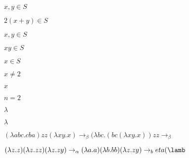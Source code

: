 \documentclass[10pt]{book}
\begin{document}
\begin{mdSnippets}
\begin{mdInlineSnippet}[4dd681d6895e10a343fda2e1bc698728]%
$x,y\in S$\end{mdInlineSnippet}%
\begin{mdInlineSnippet}[7f29155bf30f535900d25bd1a7d19cf5]%
$2(x+y)\in S$\end{mdInlineSnippet}%
\begin{mdInlineSnippet}[4dd681d6895e10a343fda2e1bc698728]%
$x,y\in S$\end{mdInlineSnippet}%
\begin{mdInlineSnippet}[94ab0a60ff9cfe6ad27f8238d7e0f075]%
$xy \in S$\end{mdInlineSnippet}%
\begin{mdInlineSnippet}%
$x\in S$\end{mdInlineSnippet}%
\begin{mdInlineSnippet}%
$x\not=2$\end{mdInlineSnippet}%
\begin{mdInlineSnippet}[9dd4e461268c8034f5c8564e155c67a6]%
$x$\end{mdInlineSnippet}%
\begin{mdInlineSnippet}[701653d734e23ac51c25137fb8831ba8]%
$n = 2$\end{mdInlineSnippet}%
\begin{mdInlineSnippet}[c6a6eb61fd9c6c913da73b3642ca147d]%
$\lambda$\end{mdInlineSnippet}%
\begin{mdInlineSnippet}[c6a6eb61fd9c6c913da73b3642ca147d]%
$\lambda$\end{mdInlineSnippet}%
\begin{mdInlineSnippet}%
$(\lambda a b c . c b a)zz(\lambda x y . x) \rightarrow_\beta (\lambda b c . (b c (\lambda x y . x))zz\rightarrow_\beta $\end{mdInlineSnippet}%
\begin{mdInlineSnippet}%
$(\lambda z . z)(\lambda z . z z)(\lambda z . z y) \rightarrow_\alpha (\lambda a . a)(\lambda b . b b)(\lambda z . z y) \rightarrow_beta (\lamb$\end{mdInlineSnippet}%

\end{mdSnippets}
\end{document}
